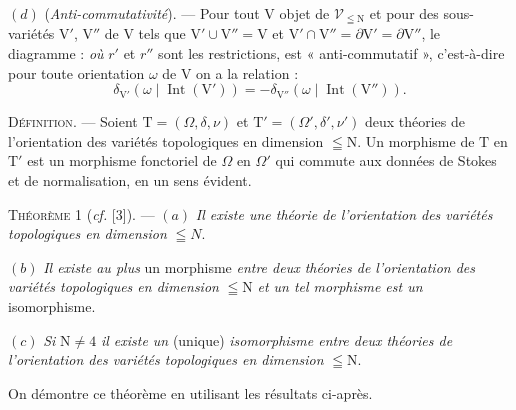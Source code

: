 $(d)$ (\textit{Anti-commutativité}). --- Pour tout $\mathrm{V}$ objet de $\mathscr{V}_{\leqq\mathrm{N}}$ et pour des sous-variétés $\mathrm{V}'$, $\mathrm{V}''$ de $\mathrm{V}$ tels que $\mathrm{V}'\cup\mathrm{V}''=\mathrm{V}$ et $\mathrm{V}'\cap\mathrm{V}''=\partial\mathrm{V}'=\partial\mathrm{V}''$, le diagramme :
\textit{où} $r'$ et $r''$ sont les restrictions, est « anti-commutatif », c'est-à-dire pour toute orientation $\omega$ de $\mathrm{V}$ on a la relation :
\[
\delta_{\mathrm{V}'}(\omega\mid\operatorname{Int}(\mathrm{V}'))=-\delta_{\mathrm{V}''}(\omega\mid\operatorname{Int}(\mathrm{V}'')).
\]

\textsc{Définition}. --- Soient $\mathrm{T}=(\Omega,\delta,\nu)$ et $\mathrm{T}'=(\Omega',\delta',\nu')$ deux théories de l'orientation des variétés topologiques en dimension $\leqq\mathrm{N}$. Un morphisme de $\mathrm{T}$ en $\mathrm{T}'$ est un morphisme fonctoriel de $\Omega$ en $\Omega'$ qui commute aux données de Stokes et de normalisation, en un sens évident.

\textsc{Théorème} 1 (\textit{cf.} [3]). --- $(a)$ \textit{Il existe une théorie de l'orientation des variétés topologiques en dimension} $\leqq N$.

$(b)$ \textit{Il existe au plus} un morphisme \textit{entre deux théories de l'orientation des variétés topologiques en dimension} $\leqq\mathrm{N}$ \textit{et un tel morphisme est un} isomorphisme.

$(c)$ \textit{Si} $\mathrm{N}\ne4$ \textit{il existe un} (unique) \textit{isomorphisme entre deux théories de l'orientation des variétés topologiques en dimension} $\leqq\mathrm{N}$.

On démontre ce théorème en utilisant les résultats ci-après.

